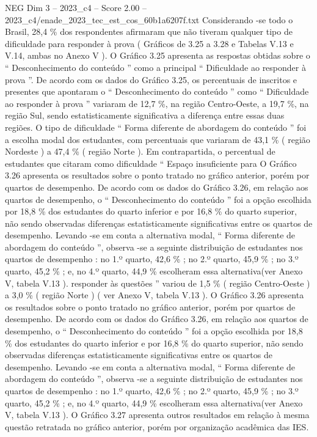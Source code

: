 \begin{textsample}{NEG Dim 3 – 2023\_c4 – Score 2.00 – 2023\_c4/enade\_2023\_tec\_est\_cos\_60b1a6207f.txt}
Considerando -se todo o Brasil, 28,4 \% dos respondentes afirmaram que não tiveram qualquer tipo de dificuldade para responder à prova ( Gráficos de 3.25 a 3.28 e Tabelas V.13 e V.14, ambas no Anexo V ).
O Gráfico 3.25 apresenta as respostas obtidas sobre o “ Desconhecimento do conteúdo ” como a principal “ Dificuldade ao responder à prova ”.
De acordo com os dados do Gráfico 3.25, os percentuais de inscritos e presentes que apontaram o “ Desconhecimento do conteúdo ” como “ Dificuldade ao responder à prova ” variaram de 12,7 \%, na região Centro-Oeste, a 19,7 \%, na região Sul, sendo estatisticamente significativa a diferença entre essas duas regiões.
O tipo de dificuldade “ Forma diferente de abordagem do conteúdo ” foi a escolha modal dos estudantes, com percentuais que variaram de 43,1 \% ( região Nordeste ) a 47,4 \% ( região Norte ).
Em contrapartida, o percentual de estudantes que citaram como dificuldade “ Espaço insuficiente para O Gráfico 3.26 apresenta os resultados sobre o ponto tratado no gráfico anterior, porém por quartos de desempenho.
De acordo com os dados do Gráfico 3.26, em relação aos quartos de desempenho, o “ Desconhecimento do conteúdo ” foi a opção escolhida por 18,8 \% dos estudantes do quarto inferior e por 16,8 \% do quarto superior, não sendo observadas diferenças estatisticamente significativas entre os quartos de desempenho.
Levando -se em conta a alternativa modal, “ Forma diferente de abordagem do conteúdo ”, observa -se a seguinte distribuição de estudantes nos quartos de desempenho : no 1.º quarto, 42,6 \% ; no 2.º quarto, 45,9 \% ; no 3.º quarto, 45,2 \% ; e, no 4.º quarto, 44,9 \% escolheram essa alternativa(ver Anexo V, tabela V.13 ). responder às questões ” variou de 1,5 \% ( região Centro-Oeste ) a 3,0 \% ( região Norte ) ( ver Anexo V, tabela V.13 ).
O Gráfico 3.26 apresenta os resultados sobre o ponto tratado no gráfico anterior, porém por quartos de desempenho.
De acordo com os dados do Gráfico 3.26, em relação aos quartos de desempenho, o “ Desconhecimento do conteúdo ” foi a opção escolhida por 18,8 \% dos estudantes do quarto inferior e por 16,8 \% do quarto superior, não sendo observadas diferenças estatisticamente significativas entre os quartos de desempenho.
Levando -se em conta a alternativa modal, “ Forma diferente de abordagem do conteúdo ”, observa -se a seguinte distribuição de estudantes nos quartos de desempenho : no 1.º quarto, 42,6 \% ; no 2.º quarto, 45,9 \% ; no 3.º quarto, 45,2 \% ; e, no 4.º quarto, 44,9 \% escolheram essa alternativa(ver Anexo V, tabela V.13 ).
O Gráfico 3.27 apresenta outros resultados em relação à mesma questão retratada no gráfico anterior, porém por organização acadêmica das IES.

\end{textsample}
